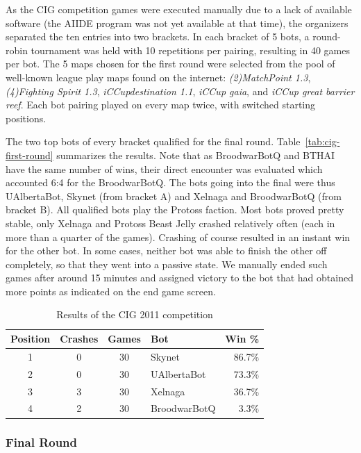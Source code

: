 \documentclass[journal]{IEEEtran}
\begin{document}
As the CIG competition games were executed manually due to
a lack of available software (the AIIDE program was not yet
available at that time), the organizers separated the ten entries into
two brackets. In each bracket of 5 bots, a round-robin
tournament was held with 10 repetitions per pairing, resulting
in 40 games per bot.
The 5 maps chosen for the first round were selected from the pool
of well-known league play maps found on the internet:
\emph{(2)MatchPoint 1.3}, \emph{(4)Fighting Spirit 1.3}, 
\emph{iCCupdestination 1.1}, \emph{iCCup gaia}, and 
\emph{iCCup great barrier reef}. Each bot pairing played
on every map twice, with switched starting positions.


The two top bots of every bracket qualified
for the final round. Table~\ref{tab:cig-first-round} summarizes
the results.
Note that as BroodwarBotQ and BTHAI have the same number of wins,
their direct encounter was evaluated which accounted 6:4 for the BroodwarBotQ.
The bots going into the final were thus UAlbertaBot, Skynet (from bracket A)
and Xelnaga and BroodwarBotQ (from bracket B). All qualified bots play the
Protoss faction. Most bots proved pretty stable, only Xelnaga and Protoss 
Beast Jelly crashed relatively often (each in more than a quarter of the games). 
Crashing of course resulted in an instant win for the other bot.
In some cases, neither bot was able to finish the other off completely,
so that they went into a passive state. We manually ended such games after
around 15 minutes and assigned victory to the bot that had obtained more
points as indicated on the end game screen.

\begin{table}[!b]
\caption{Results of the CIG 2011 competition}
\label{tab:cig-final-round}
\centering
\begin{tabular}{|c|c|c|l|r|}
\hline
{\bfseries Position} & {\bfseries Crashes} & {\bfseries Games} & {\bfseries Bot} & {\bfseries Win \%} \\
\hline
1 & 0 &  30 &  Skynet       &  86.7\%\\
2 & 0 &  30 &  UAlbertaBot  &  73.3\%\\
3 & 3 &  30 &  Xelnaga      &  36.7\%\\
4 & 2 &  30 &  BroodwarBotQ   &  3.3\%\\
\hline
\end{tabular}
\end{table}



\subsubsection{Final Round}
\label{sec:cig-final-round}
\end{document}
